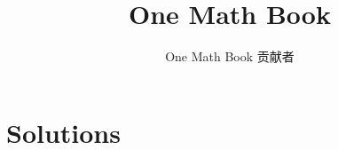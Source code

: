 \documentclass[11pt,a4paper,twoside,openany]{book}
\title{One Math Book}
\author{One Math Book 贡献者}
\date{\bookdate}
\begin{document}
\mainmatter
\setcounter{chapter}{3}

\appendix
\chapter{Solutions}

\end{document}
